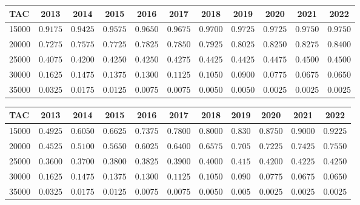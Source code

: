 \documentclass[shortnames,nojss,article]{jss}
\begin{document}
\begin{tabular}{lcccccccccc}
\hline
TAC  & 2013 & 2014 & 2015 & 2016 & 2017 & 2018 & 2019 & 2020 & 2021 & 2022 \\ 
\hline
15000  & $0.9175$ & $0.9425$ & $0.9575$ & $0.9650$ & $0.9675$ & $0.9700$ & $0.9725$ & $0.9725$ & $0.9750$ & $0.9750$ \\
20000  & $0.7275$ & $0.7575$ & $0.7725$ & $0.7825$ & $0.7850$ & $0.7925$ & $0.8025$ & $0.8250$ & $0.8275$ & $0.8400$ \\
25000  & $0.4075$ & $0.4200$ & $0.4250$ & $0.4250$ & $0.4275$ & $0.4425$ & $0.4425$ & $0.4475$ & $0.4500$ & $0.4500$ \\
30000  & $0.1625$ & $0.1475$ & $0.1375$ & $0.1300$ & $0.1125$ & $0.1050$ & $0.0900$ & $0.0775$ & $0.0675$ & $0.0650$ \\
35000  & $0.0325$ & $0.0175$ & $0.0125$ & $0.0075$ & $0.0075$ & $0.0050$ & $0.0050$ & $0.0025$ & $0.0025$ & $0.0025$ \\
\hline 
\end{tabular}

\begin{Schunk}
\begin{Soutput}
\begin{tabular}{lcccccccccc}
\hline
TAC  & 2013 & 2014 & 2015 & 2016 & 2017 & 2018 & 2019 & 2020 & 2021 & 2022 \\ 
\hline
15000  & $0.4925$ & $0.6050$ & $0.6625$ & $0.7375$ & $0.7800$ & $0.8000$ & $0.830$ & $0.8750$ & $0.9000$ & $0.9225$ \\
20000  & $0.4525$ & $0.5100$ & $0.5650$ & $0.6025$ & $0.6400$ & $0.6575$ & $0.705$ & $0.7225$ & $0.7425$ & $0.7550$ \\
25000  & $0.3600$ & $0.3700$ & $0.3800$ & $0.3825$ & $0.3900$ & $0.4000$ & $0.415$ & $0.4200$ & $0.4225$ & $0.4250$ \\
30000  & $0.1625$ & $0.1475$ & $0.1375$ & $0.1300$ & $0.1125$ & $0.1050$ & $0.090$ & $0.0775$ & $0.0675$ & $0.0650$ \\
35000  & $0.0325$ & $0.0175$ & $0.0125$ & $0.0075$ & $0.0075$ & $0.0050$ & $0.005$ & $0.0025$ & $0.0025$ & $0.0025$ \\
\hline 
\end{tabular}
\end{Soutput}
\end{Schunk}
                  
\end{document}
